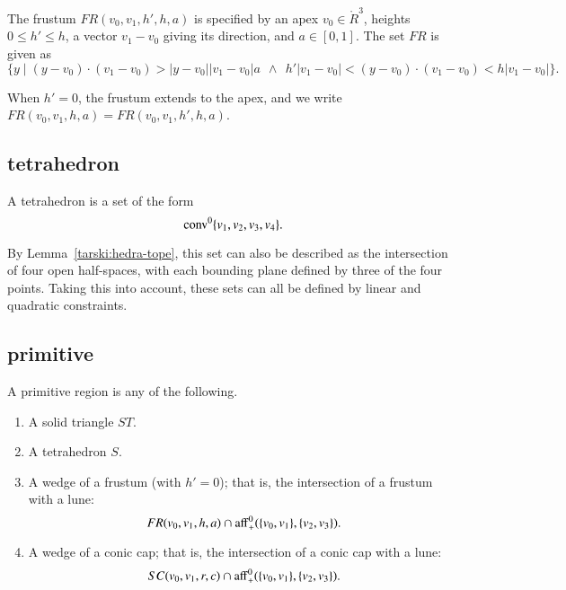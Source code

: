 \begin{definition} The frustum
$FR(v_0,v_1,h',h,a)$ is specified by an apex $v_0\in\ring{R}^3$, heights
$0\le h'\le h$, a vector $v_1-v_0$ giving its direction, and
$a\in[0,1]$. The set $FR$ is given as
    $$
    \{ y \mid (y-v_0)\cdot (v_1-v_0) > |y-v_0| |v_1-v_0|  a \ \ \land\ \
       h'|v_1-v_0| < (y-v_0) \cdot (v_1-v_0) < h|v_1-v_0| \}.
    $$
\end{definition}

When $h'=0$, the frustum extends to the apex, and
we write $FR(v_0,v_1,h,a)=FR(v_0,v_1,h',h,a)$.

\subsection{tetrahedron}

\begin{definition} A tetrahedron is a set of the form
$${\operatorname{conv}}^0\{v_1,v_2,v_3,v_4\}.$$
\end{definition}

By Lemma~\ref{tarski:hedra-tope}, this set can also be described
as the intersection of four open half-spaces, with each bounding
plane defined by three of the four points.
Taking this into account,
these sets can all be defined by linear and quadratic
constraints.

\subsection{primitive}

\begin{definition} A primitive region is any of the following.

\begin{enumerate}%
 \item A solid triangle $ST$.
 \item A tetrahedron $S$.
 \item A wedge of a frustum (with $h'=0$); 
that is, the intersection of a frustum with
 a lune:
    $$
     FR(v_0,v_1,h,a) \cap {\operatorname{aff}}^0_+(\{v_0,v_1\},\{v_2,v_3\}).
    $$
\item A wedge of a conic cap; that is, the intersection of a conic cap
with
    a lune:
    $$
    SC(v_0,v_1,r,c) \cap{\operatorname{aff}}^0_+(\{v_0,v_1\},\{v_2,v_3\}).
    $$
\end{enumerate}

\end{definition}

